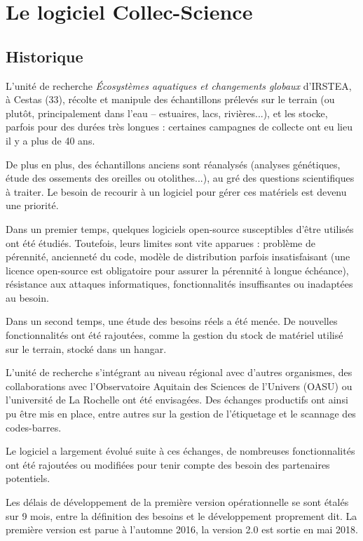 \chapter{Le logiciel Collec-Science}
\section{Historique}

L'unité de recherche \textit{Écosystèmes aquatiques et changements globaux} d'IRSTEA, à Cestas (33), récolte et manipule des échantillons prélevés sur le terrain (ou plutôt, principalement dans l'eau -- estuaires, lacs, rivières...), et les stocke, parfois pour des durées très longues : certaines campagnes de collecte ont eu lieu il y a plus de 40 ans.

De plus en plus, des échantillons anciens sont réanalysés (analyses génétiques, étude des ossements des oreilles ou otolithes...), au gré des questions scientifiques à traiter. 
Le besoin de recourir à un logiciel pour gérer ces matériels est devenu une priorité.

Dans un premier temps, quelques logiciels open-source susceptibles d'être utilisés ont été étudiés. Toutefois, leurs limites sont vite apparues : problème de pérennité, ancienneté du code, modèle de distribution parfois insatisfaisant (une licence open-source est obligatoire pour assurer la pérennité à longue échéance), résistance aux attaques informatiques, fonctionnalités insuffisantes ou inadaptées au besoin.

Dans un second temps, une étude des besoins réels a été menée. De nouvelles fonctionnalités ont été rajoutées, comme la gestion du stock de matériel utilisé sur le terrain, stocké dans un hangar.

L'unité de recherche s'intégrant au niveau régional avec d'autres organismes, des collaborations avec l'Observatoire Aquitain des Sciences de l'Univers (OASU) ou l'université de La Rochelle ont été envisagées.
Des échanges productifs ont ainsi pu être mis en place, entre autres sur la gestion de l'étiquetage et le scannage des codes-barres.

Le logiciel a largement évolué suite à ces échanges, de nombreuses fonctionnalités ont été rajoutées ou modifiées pour tenir compte des besoin des partenaires potentiels. 

Les délais de développement de la première version opérationnelle se sont étalés sur 9 mois, entre la définition des besoins et le développement proprement dit. 
La première version est parue à l'automne 2016, la version 2.0 est sortie en mai 2018.

